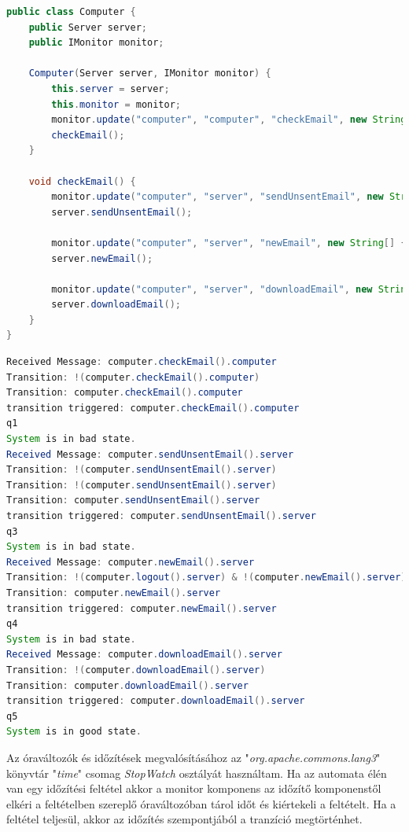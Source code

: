 \begin{lstlisting}[language=java, frame=single, float=ht!, caption={A Computer java osztálya.},captionpos=b,label=computer_java]
public class Computer {
	public Server server;
	public IMonitor monitor;

	Computer(Server server, IMonitor monitor) {
		this.server = server;
		this.monitor = monitor;
		monitor.update("computer", "computer", "checkEmail", new String[] {});
		checkEmail();
	}

	void checkEmail() {
		monitor.update("computer", "server", "sendUnsentEmail", new String[] {});
		server.sendUnsentEmail();

		monitor.update("computer", "server", "newEmail", new String[] {});
		server.newEmail();

		monitor.update("computer", "server", "downloadEmail", new String[] {});
		server.downloadEmail();
	}
}
\end{lstlisting}

\begin{lstlisting}[language=java, frame=single, float=ht!, caption={Időzítéses példa monitor kimenete.},captionpos=b,label=computer_monitor]
Received Message: computer.checkEmail().computer
Transition: !(computer.checkEmail().computer)
Transition: computer.checkEmail().computer
transition triggered: computer.checkEmail().computer
q1
System is in bad state.
Received Message: computer.sendUnsentEmail().server
Transition: !(computer.sendUnsentEmail().server)
Transition: !(computer.sendUnsentEmail().server)
Transition: computer.sendUnsentEmail().server
transition triggered: computer.sendUnsentEmail().server
q3
System is in bad state.
Received Message: computer.newEmail().server
Transition: !(computer.logout().server) & !(computer.newEmail().server)
Transition: computer.newEmail().server
transition triggered: computer.newEmail().server
q4
System is in bad state.
Received Message: computer.downloadEmail().server
Transition: !(computer.downloadEmail().server)
Transition: computer.downloadEmail().server
transition triggered: computer.downloadEmail().server
q5
System is in good state.
\end{lstlisting}

Az óraváltozók és időzítések megvalósításához az "\textit{org.apache.commons.lang3}" könyvtár "\textit{time}" csomag \textit{StopWatch} osztályát használtam.
Ha az automata élén van egy időzítési feltétel akkor a monitor komponens az időzítő komponenstől elkéri a feltételben szereplő óraváltozóban tárol időt és kiértekeli a feltételt.
Ha a feltétel teljesül, akkor az időzítés szempontjából a tranzíció megtörténhet.